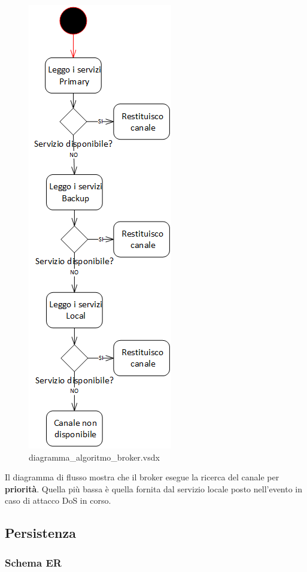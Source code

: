 \documentclass[a4paper]{article}
\begin{document}
\begin{figure}[H]
    \includegraphics[scale=1]{Progettazione/Comportamento/diagramma_algoritmo_broker.png}
    \centering
    \caption{diagramma\_algoritmo\_broker.vsdx}
\end{figure}

Il diagramma di flusso mostra che il broker esegue la ricerca del canale per \textbf{priorità}. Quella più bassa è quella fornita dal servizio locale posto nell'evento in caso di attacco DoS in corso.

\newpage

\subsection{Persistenza}

\subsubsection{Schema ER}
\end{document}
